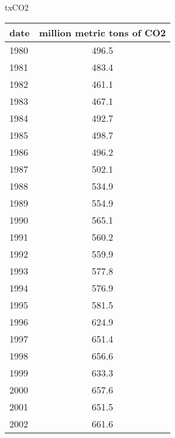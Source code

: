 \documentclass{mcmthesis}
\begin{document}
\begin{appendices}


\begin{minipage}{\textwidth}
  \begin{minipage}[t]{0.45\textwidth}
    \centering
      \makeatletter{}\makeatother\caption{txCO2}
      \begin{tabular}{|l|c|}
        \hline
        date & million metric tons of CO2 \\ \hline
        1980 & 496.5                      \\ \hline
        1981 & 483.4                      \\ \hline
        1982 & 461.1                      \\ \hline
        1983 & 467.1                      \\ \hline
        1984 & 492.7                      \\ \hline
        1985 & 498.7                      \\ \hline
        1986 & 496.2                      \\ \hline
        1987 & 502.1                      \\ \hline
        1988 & 534.9                      \\ \hline
        1989 & 554.9                      \\ \hline
        1990 & 565.1                      \\ \hline
        1991 & 560.2                      \\ \hline
        1992 & 559.9                      \\ \hline
        1993 & 577.8                      \\ \hline
        1994 & 576.9                      \\ \hline
        1995 & 581.5                      \\ \hline
        1996 & 624.9                      \\ \hline
        1997 & 651.4                      \\ \hline
        1998 & 656.6                      \\ \hline
        1999 & 633.3                      \\ \hline
        2000 & 657.6                      \\ \hline
        2001 & 651.5                      \\ \hline
        2002 & 661.6                      \\ \hline

\end{tabular}
\end{minipage}
\end{minipage}
\end{appendices}
\end{document}

